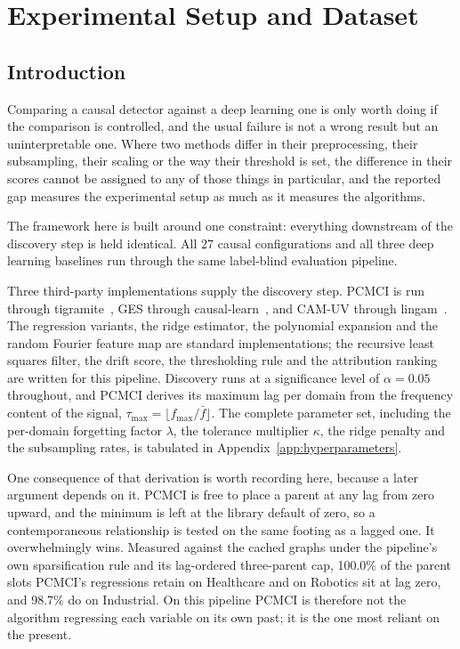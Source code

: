 \chapter{Experimental Setup and Dataset}
\label{ch:experimental_setup}

\section{Introduction}
Comparing a causal detector against a deep learning one is only worth doing if the comparison is controlled, and the usual failure is not a wrong result but an uninterpretable one. Where two methods differ in their preprocessing, their subsampling, their scaling or the way their threshold is set, the difference in their scores cannot be assigned to any of those things in particular, and the reported gap measures the experimental setup as much as it measures the algorithms.

The framework here is built around one constraint: everything downstream of the discovery step is held identical. All 27 causal configurations and all three deep learning baselines run through the same label-blind evaluation pipeline.

Three third-party implementations supply the discovery step. PCMCI is run through tigramite~\cite{runge2023tigramite}, GES through causal-learn~\cite{zheng2024causallearn}, and CAM-UV through lingam~\cite{ikeuchi2023lingam}. The regression variants, the ridge estimator, the polynomial expansion and the random Fourier feature map are standard implementations; the recursive least squares filter, the drift score, the thresholding rule and the attribution ranking are written for this pipeline. Discovery runs at a significance level of $\alpha = 0.05$ throughout, and PCMCI derives its maximum lag per domain from the frequency content of the signal, $\tau_{\max} = \lfloor f_{\max} / \bar{f} \rfloor$. The complete parameter set, including the per-domain forgetting factor $\lambda$, the tolerance multiplier $\kappa$, the ridge penalty and the subsampling rates, is tabulated in Appendix~\ref{app:hyperparameters}.

\label{sec:setup-lag}
One consequence of that derivation is worth recording here, because a later argument depends on it. PCMCI is free to place a parent at any lag from zero upward, and the minimum is left at the library default of zero, so a contemporaneous relationship is tested on the same footing as a lagged one. It overwhelmingly wins. Measured against the cached graphs under the pipeline's own sparsification rule and its lag-ordered three-parent cap, 100.0\% of the parent slots PCMCI's regressions retain on Healthcare and on Robotics sit at lag zero, and 98.7\% do on Industrial. On this pipeline PCMCI is therefore not the algorithm regressing each variable on its own past; it is the one most reliant on the present.

